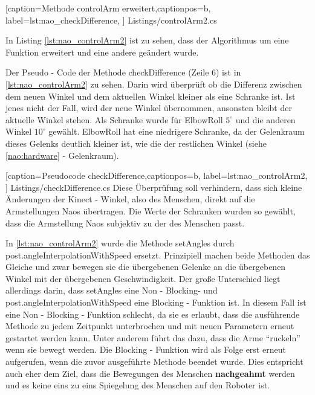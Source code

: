 
    [caption={Methode \textsf{controlArm erweitert}},captionpos=b,
       label=lst:nao_checkDifference,
       ]	
 {Listings/controlArm2.cs}

In Listing \ref{lst:nao_controlArm2} ist zu sehen, dass der Algorithmus um eine Funktion erweitert und eine andere geändert wurde.

Der Pseudo - Code der Methode \textsf{checkDifference} (Zeile 6) ist in \ref{lst:nao_controlArm2} zu sehen. Darin wird überprüft ob die Differenz zwischen dem neuen Winkel und dem aktuellen Winkel kleiner als eine Schranke ist. Ist jenes nicht der Fall, wird der neue Winkel übernommen, ansonsten bleibt der aktuelle Winkel stehen. 
Als Schranke wurde für ElbowRoll $5^\circ$ und die anderen Winkel $10^\circ$ gewählt. ElbowRoll hat eine niedrigere Schranke, da der Gelenkraum dieses Gelenks deutlich kleiner ist, wie die der restlichen Winkel (siehe \ref{nao:hardware} - Gelenkraum). 

    [caption={Pseudocode \textsf{checkDifference}},captionpos=b,
       label=lst:nao_controlArm2,
       ]	
 {Listings/checkDifference.cs}
Diese Überprüfung soll verhindern, dass sich kleine Änderungen der Kinect - Winkel, also des Menschen, direkt auf die Armstellungen Naos übertragen. Die Werte der Schranken wurden so gewählt, dass die Armstellung Naos subjektiv zu der des Menschen passt.


In \ref{lst:nao_controlArm2} wurde die Methode \textsf{setAngles} durch \textsf{post.angleInterpolationWithSpeed} ersetzt. Prinzipiell machen beide Methoden das Gleiche und zwar bewegen sie die übergebenen Gelenke an die übergebenen Winkel mit der übergebenen Geschwindigkeit. Der große Unterschied liegt allerdings darin, dass \textsf{setAngles} eine Non - Blocking- und \textsf{post.angleInterpolationWithSpeed} eine Blocking - Funktion ist. In diesem Fall ist eine Non - Blocking - Funktion schlecht, da sie es erlaubt, dass die ausführende Methode zu jedem Zeitpunkt unterbrochen  und mit neuen Parametern erneut gestartet werden kann. Unter anderem führt das dazu, dass die Arme "`ruckeln"' wenn sie bewegt werden. Die Blocking - Funktion wird als Folge erst erneut aufgerufen, wenn die zuvor ausgeführte Methode beendet wurde. Dies entspricht auch eher dem Ziel, dass die Bewegungen des Menschen \textbf{nachgeahmt} werden und es keine eins zu eins Spiegelung des Menschen auf den Roboter ist.

 